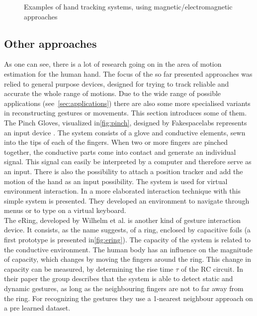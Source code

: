\begin{figure}[h]
	\hfill
	
	\caption{Examples of hand tracking systems, using magnetic/electromagnetic approaches}
	\label{fig:examplesMagnetic}
\end{figure}


\subsection{Other approaches} \label{subsec:approaches:other}
As one can see, there is a lot of research going on in the area of motion estimation for the human hand. The focus of the so far presented approaches was relied to general purpose devices, designed for trying to track reliable and accurate the whole range of motions. Due to the wide range of possible applications (see~\ref{sec:applications}) there are also some more specialised variants in reconstructing gestures or movements. This section introduces some of them.\\
The Pinch Gloves, visualized in\ref{fig:pinch}, designed by Fakespacelabs represents an input device \cite{bowman2001using}. The system consists of a glove and conductive elements, sewn into the tips of each of the fingers. When two or more fingers are pinched together, the conductive parts come into contact and generate an individual signal. This signal can easily be interpreted by a computer and therefore serve as an input. There is also the possibility to attach a position tracker and add the motion of the hand as an input possibility. The system is used for virtual environment interaction. In \cite{bowman2001using} a more elaborated interaction technique with this simple system is presented. They developed an environment to navigate through menus or to type on a virtual keyboard.\\
The eRing, developed by Wilhelm et al. is another kind of gesture interaction device. It consists, as the name suggests, of a ring, enclosed by capacitive foils (a first prototype is presented in\ref{fig:ering}). The capacity of the system is related to the conductive environment. The human body has an influence on the magnitude of capacity, which changes by moving the fingers around the ring. This change in capacity can be measured, by determining the rise time $ \tau $ of the RC circuit. In their paper the group describes that the system is able to detect static and dynamic gestures, as long as the neighbouring fingers are not to far away from the ring. For recognizing the gestures they use a 1-nearest neighbour approach on a pre learned dataset.\\
